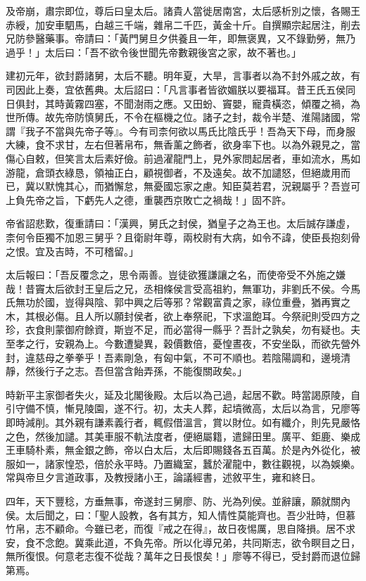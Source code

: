\begin{pinyinscope}
及帝崩，肅宗即位，尊后曰皇太后。諸貴人當徙居南宮，太后感析別之懷，各賜王赤綬，加安車駟馬，白越三千端，雜帛二千匹，黃金十斤。自撰顯宗起居注，削去兄防參醫藥事。帝請曰：「黃門舅旦夕供養且一年，即無褒異，又不錄勤勞，無乃過乎！」太后曰：「吾不欲令後世聞先帝數親後宮之家，故不著也。」

建初元年，欲封爵諸舅，太后不聽。明年夏，大旱，言事者以為不封外戚之故，有司因此上奏，宜依舊典。太后詔曰：「凡言事者皆欲媚朕以要福耳。昔王氏五侯同日俱封，其時黃霧四塞，不聞澍雨之應。又田蚡、竇嬰，寵貴橫恣，傾覆之禍，為世所傳。故先帝防慎舅氏，不令在樞機之位。諸子之封，裁令半楚、淮陽諸國，常謂『我子不當與先帝子等』。今有司柰何欲以馬氏比陰氏乎！吾為天下母，而身服大練，食不求甘，左右但著帛布，無香薰之飾者，欲身率下也。以為外親見之，當傷心自敕，但笑言太后素好儉。前過濯龍門上，見外家問起居者，車如流水，馬如游龍，倉頭衣綠恳，領袖正白，顧視御者，不及遠矣。故不加譴怒，但絕歲用而已，冀以默愧其心，而猶懈怠，無憂國忘家之慮。知臣莫若君，況親屬乎？吾豈可上負先帝之旨，下虧先人之德，重襲西京敗亡之禍哉！」固不許。

帝省詔悲歎，復重請曰：「漢興，舅氏之封侯，猶皇子之為王也。太后誠存謙虛，柰何令臣獨不加恩三舅乎？且衛尉年尊，兩校尉有大病，如令不諱，使臣長抱刻骨之恨。宜及吉時，不可稽留。」

太后報曰：「吾反覆念之，思令兩善。豈徒欲獲謙讓之名，而使帝受不外施之嫌哉！昔竇太后欲封王皇后之兄，丞相條侯言受高祖約，無軍功，非劉氏不侯。今馬氏無功於國，豈得與陰、郭中興之后等邪？常觀富貴之家，祿位重疊，猶再實之木，其根必傷。且人所以願封侯者，欲上奉祭祀，下求溫飽耳。今祭祀則受四方之珍，衣食則蒙御府餘資，斯豈不足，而必當得一縣乎？吾計之孰矣，勿有疑也。夫至孝之行，安親為上。今數遭變異，穀價數倍，憂惶晝夜，不安坐臥，而欲先營外封，違慈母之拳拳乎！吾素剛急，有匈中氣，不可不順也。若陰陽調和，邊境清靜，然後行子之志。吾但當含飴弄孫，不能復關政矣。」

時新平主家御者失火，延及北閣後殿。太后以為己過，起居不歡。時當謁原陵，自引守備不慎，慚見陵園，遂不行。初，太夫人葬，起墳微高，太后以為言，兄廖等即時減削。其外親有謙素義行者，輒假借溫言，賞以財位。如有纖介，則先見嚴恪之色，然後加譴。其美車服不軌法度者，便絕屬籍，遣歸田里。廣平、鉅鹿、樂成王車騎朴素，無金銀之飾，帝以白太后，太后即賜錢各五百萬。於是內外從化，被服如一，諸家惶恐，倍於永平時。乃置織室，蠶於濯龍中，數往觀視，以為娛樂。常與帝旦夕言道政事，及教授諸小王，論議經書，述敘平生，雍和終日。

四年，天下豐稔，方垂無事，帝遂封三舅廖、防、光為列侯。並辭讓，願就關內侯。太后聞之，曰：「聖人設教，各有其方，知人情性莫能齊也。吾少壯時，但慕竹帛，志不顧命。今雖已老，而復『戒之在得』，故日夜惕厲，思自降損。居不求安，食不念飽。冀乘此道，不負先帝。所以化導兄弟，共同斯志，欲令瞑目之日，無所復恨。何意老志復不從哉？萬年之日長恨矣！」廖等不得已，受封爵而退位歸第焉。


\end{pinyinscope}
